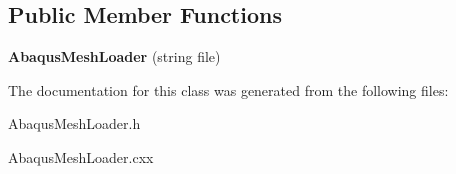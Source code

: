 \subsection*{Public Member Functions}
\begin{DoxyCompactItemize}
\item 
\hypertarget{class_abaqus_mesh_loader_a0c6daadc09b5dd3c3c1f8af90a44f8d9}{
{\bfseries AbaqusMeshLoader} (string file)}
\label{class_abaqus_mesh_loader_a0c6daadc09b5dd3c3c1f8af90a44f8d9}

\end{DoxyCompactItemize}


The documentation for this class was generated from the following files:\begin{DoxyCompactItemize}
\item 
AbaqusMeshLoader.h\item 
AbaqusMeshLoader.cxx\end{DoxyCompactItemize}
